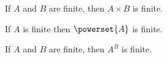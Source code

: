 \begin{proposition}
	If $A$ and $B$ are finite, then $A \times B$ is finite.
\end{proposition}



\begin{proposition}
	If $A$ is finite then $\powerset{A}$ is finite.
\end{proposition}


\begin{proposition}
	If $A$ and $B$ are finite, then $A^B$ is finite.
\end{proposition}

